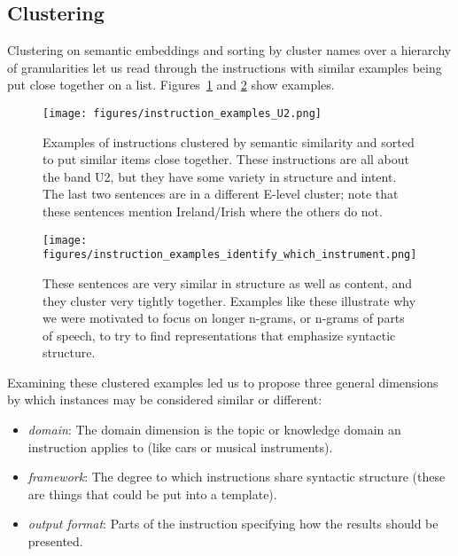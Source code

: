 \subsection{Clustering}

Clustering on semantic embeddings and sorting by cluster names over a hierarchy of granularities let us read through the instructions with similar examples being put close together on a list. Figures~\ref{fig:instruction_examples_U2} and \ref{fig:instruction_examples_iwi} show examples.

\begin{figure}
  \centering
  \texttt{[image: figures/instruction\_examples\_U2.png]}
  \caption{Examples of instructions clustered by semantic similarity and sorted to put similar items close together. These instructions are all about the band U2, but they have some variety in structure and intent. The last two sentences are in a different E-level cluster; note that these sentences mention Ireland/Irish where the others do not.}
  \label{fig:instruction_examples_U2}
\end{figure}


\begin{figure}
  \centering
  \texttt{[image: figures/instruction\_examples\_identify\_which\_instrument.png]}
  \caption{These sentences are very similar in structure as well as content, and they cluster very tightly together. Examples like these illustrate why we were motivated to focus on longer n-grams, or n-grams of parts of speech, to try to find representations that emphasize syntactic structure.}
  \label{fig:instruction_examples_iwi}
\end{figure}

Examining these clustered examples led us to propose three general dimensions by which instances may be considered similar or different:
\begin{itemize}
\item{\emph{domain}}: The domain dimension is the topic or knowledge domain an instruction applies to (like cars or musical instruments).
\item{\emph{framework}}: The degree to which instructions share syntactic structure (these are things that could be put into a template).
\item{\emph{output format}}: Parts of the instruction specifying how the results should be presented.

\end{itemize}

